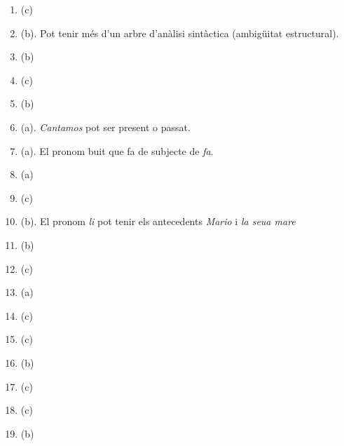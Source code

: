 \begin{enumerate}
\item (c)
\item (b). Pot tenir més d'un arbre d'anàlisi sintàctica (ambigüitat
  estructural).
\item (b)
\item (c)
\item (b)
\item (a). \emph{Cantamos} pot ser present o passat.
\item (a). El pronom buit que fa de subjecte de \emph{fa}.
\item (a)
\item (c)
\item (b). El pronom \emph{li} pot tenir els antecedents \emph{Mario}
  i \emph{la seua mare}
\item (b)
\item (c)
\item (a)
\item (c)
\item (c)
\item (b)
\item (c)
\item (c)
\item (b)
\end{enumerate}

